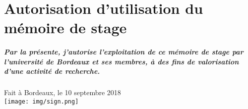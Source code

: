 \documentclass[a4paper, 12pt, openany, oneside, abstract=on]{article} %
\begin{document}
\newpage
\part*{Autorisation d'utilisation du mémoire de stage}
\vspace{3cm}
\subsubsection*{Par la présente, j'autorise l'exploitation de ce mémoire de stage par l'université de Bordeaux et ses membres, à des fins de valorisation d'une activité de recherche.}
\vspace{3cm}
\begin{flushright}
    Fait à Bordeaux, le 10 septembre 2018\\
    \vspace{3cm}
    \texttt{[image: img/sign.png]}
\end{flushright}
\end{document}
